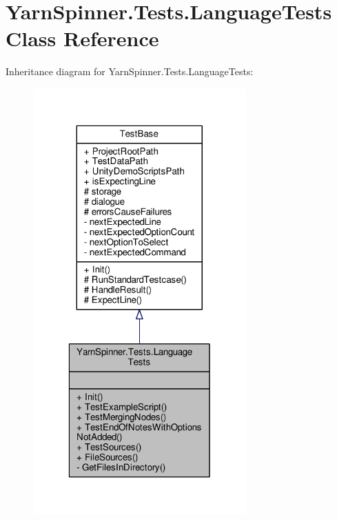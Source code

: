 \hypertarget{a00122}{\section{Yarn\-Spinner.\-Tests.\-Language\-Tests Class Reference}
\label{a00122}
}


Inheritance diagram for Yarn\-Spinner.\-Tests.\-Language\-Tests\-:
\nopagebreak
\begin{figure}[H]
\begin{center}
\leavevmode
\includegraphics[width=232pt]{a00728}
\end{center}
\end{figure}



